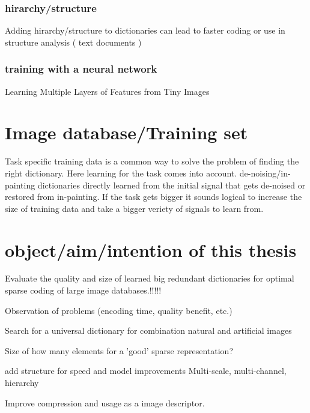 \cite{double sparsity}
\subsubsection{hirarchy/structure}
Adding hirarchy/structure to dictionaries can lead to faster coding or use in structure analysis ( text documents )
\cite{Jenatton2010}
\subsubsection{training with a neural network}
Learning Multiple Layers of Features from Tiny Images \cite{Krizhevsky2009}


\section{Image database/Training set}
Task specific training data is a common way to solve the problem of finding the right dictionary. 
Here learning for the task comes into account. de-noising/in-painting dictionaries directly learned from the initial
signal that gets de-noised or restored from in-painting.
If the task gets bigger it sounds logical to increase the size of training data and take a bigger veriety of signals to learn from.


\section{object/aim/intention of this thesis}
Evaluate the quality and size of learned big redundant dictionaries for 
optimal sparse coding of large image databases.!!!!!

Observation of problems (encoding time, quality benefit, etc.)

Search for a universal dictionary for combination natural and artificial images
 
Size of 
how many elements for a 'good' sparse representation?

add structure for speed and model improvements
Multi-scale, multi-channel, hierarchy

Improve compression and usage as a image descriptor.
